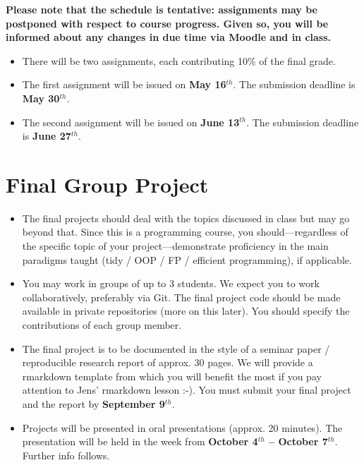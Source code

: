 \documentclass[]{article}
\begin{document}
\textbf{Please note that the schedule is tentative: assignments may be
postponed with respect to course progress. Given so, you will be
informed about any changes in due time via Moodle and in class.}

\begin{itemize}
\item
  There will be two assignments, each contributing 10\% of the final
  grade.
\item
  The first assignment will be issued on \textbf{May 16\(^{th}\)}. The
  submission deadline is \textbf{May 30\(^{th}\)}.
\item
  The second assignment will be issued on \textbf{June 13\(^{th}\)}. The
  submission deadline is \textbf{June 27\(^{th}\)}.
\end{itemize}

\hypertarget{final-group-project}{%
\section{Final Group Project}\label{final-group-project}}

\begin{itemize}
\item
  The final projects should deal with the topics discussed in class but
  may go beyond that. Since this is a programming course, you
  should---regardless of the specific topic of your
  project---demonstrate proficiency in the main paradigms taught (tidy /
  OOP / FP / efficient programming), if applicable.
\item
  You may work in groups of up to 3 students. We expect you to work
  collaboratively, preferably via Git. The final project code should be
  made available in private repositories (more on this later). You
  should specify the contributions of each group member.
\item
  The final project is to be documented in the style of a seminar paper
  / reproducible research report of approx. 30 pages. We will provide a
  rmarkdown template from which you will benefit the most if you pay
  attention to Jens' rmarkdown lesson :-). You must submit your final
  project and the report by \textbf{September 9\(^{th}\)}.
\item
  Projects will be presented in oral presentations (approx. 20 minutes).
  The presentation will be held in the week from \textbf{October
  4\(^{th}\) -- October 7\(^{th}\)}. Further info follows.
\end{itemize}
\end{document}
